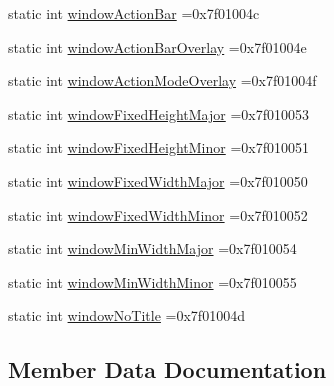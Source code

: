 \begin{DoxyCompactItemize}
\item 
static int \hyperlink{classandroid_1_1support_1_1v7_1_1mediarouter_1_1R_1_1attr_a91fe25780bb1bdc502dc1c2a33c8549d}{window\+Action\+Bar} =0x7f01004c
\item 
static int \hyperlink{classandroid_1_1support_1_1v7_1_1mediarouter_1_1R_1_1attr_a3c1ca004f5390eccb164cfda9f9392f8}{window\+Action\+Bar\+Overlay} =0x7f01004e
\item 
static int \hyperlink{classandroid_1_1support_1_1v7_1_1mediarouter_1_1R_1_1attr_ab789e70260e203465110433076413756}{window\+Action\+Mode\+Overlay} =0x7f01004f
\item 
static int \hyperlink{classandroid_1_1support_1_1v7_1_1mediarouter_1_1R_1_1attr_ae94c6a494cc42532fa3c754e8ed28b40}{window\+Fixed\+Height\+Major} =0x7f010053
\item 
static int \hyperlink{classandroid_1_1support_1_1v7_1_1mediarouter_1_1R_1_1attr_a6225254ac3740a7bf55305b4825f479b}{window\+Fixed\+Height\+Minor} =0x7f010051
\item 
static int \hyperlink{classandroid_1_1support_1_1v7_1_1mediarouter_1_1R_1_1attr_ae56e50cdd34b9aa2991748fffbe15989}{window\+Fixed\+Width\+Major} =0x7f010050
\item 
static int \hyperlink{classandroid_1_1support_1_1v7_1_1mediarouter_1_1R_1_1attr_ad959f251618f4e05f6853816fcab195d}{window\+Fixed\+Width\+Minor} =0x7f010052
\item 
static int \hyperlink{classandroid_1_1support_1_1v7_1_1mediarouter_1_1R_1_1attr_a705a5811e50f04b35af963dead610055}{window\+Min\+Width\+Major} =0x7f010054
\item 
static int \hyperlink{classandroid_1_1support_1_1v7_1_1mediarouter_1_1R_1_1attr_acdc05eee53f13576d9e2e5bfd4295487}{window\+Min\+Width\+Minor} =0x7f010055
\item 
static int \hyperlink{classandroid_1_1support_1_1v7_1_1mediarouter_1_1R_1_1attr_a66963fa72a2f109826b4838d68850ae1}{window\+No\+Title} =0x7f01004d
\end{DoxyCompactItemize}


\subsection{Member Data Documentation}
\mbox{\label{classandroid_1_1support_1_1v7_1_1mediarouter_1_1R_1_1attr_a5f28c6cba7400ef345df849042e135b7}} 
